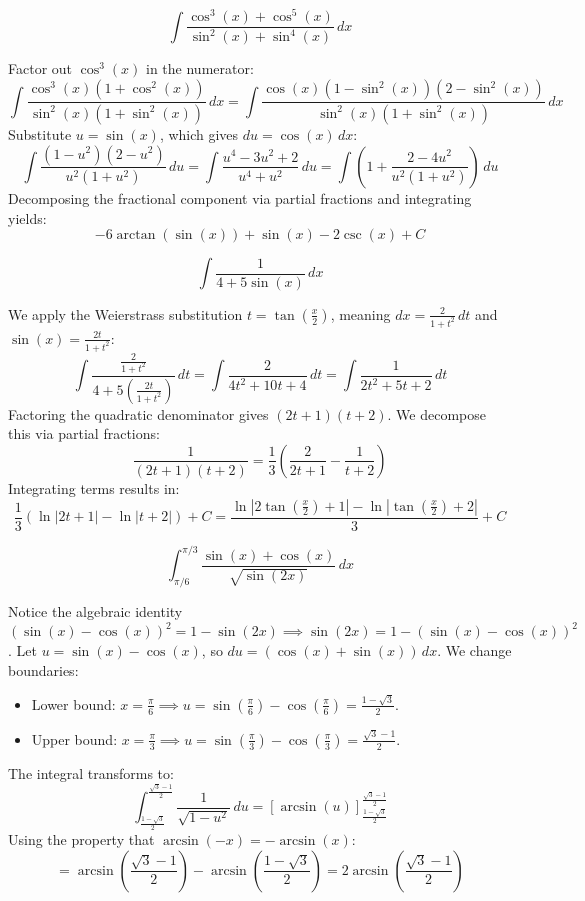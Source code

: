 \begin{questions}
    \question 
    \[ \int \frac{\cos^{3}(x)+\cos^{5}(x)}{\sin^{2}(x)+\sin^{4}(x)} \, dx \]
    \begin{solution}
        Factor out $\cos^3(x)$ in the numerator:
        \[ \int \frac{\cos^3(x)(1+\cos^2(x))}{\sin^2(x)(1+\sin^2(x))} \, dx = \int \frac{\cos(x)(1-\sin^2(x))(2-\sin^2(x))}{\sin^2(x)(1+\sin^2(x))} \, dx \]
        Substitute $u = \sin(x)$, which gives $du = \cos(x) \, dx$:
        \[ \int \frac{(1-u^2)(2-u^2)}{u^2(1+u^2)} \, du = \int \frac{u^4-3u^2+2}{u^4+u^2} \, du = \int \left( 1 + \frac{2-4u^2}{u^2(1+u^2)} \right) \, du \]
        Decomposing the fractional component via partial fractions and integrating yields:
        \[ -6\arctan(\sin(x)) + \sin(x) - 2\csc(x) + C \]
    \end{solution}

    \question 
    \[ \int \frac{1}{4+5\sin(x)} \, dx \]
    \begin{solution}
        We apply the Weierstrass substitution $t = \tan(\frac{x}{2})$, meaning $dx = \frac{2}{1+t^2} \, dt$ and $\sin(x) = \frac{2t}{1+t^2}$:
        \[ \int \frac{\frac{2}{1+t^2}}{4 + 5\left(\frac{2t}{1+t^2}\right)} \, dt = \int \frac{2}{4t^2+10t+4} \, dt = \int \frac{1}{2t^2+5t+2} \, dt \]
        Factoring the quadratic denominator gives $(2t+1)(t+2)$. We decompose this via partial fractions:
        \[ \frac{1}{(2t+1)(t+2)} = \frac{1}{3}\left(\frac{2}{2t+1} - \frac{1}{t+2}\right) \]
        Integrating terms results in:
        \[ \frac{1}{3}\left(\ln|2t+1| - \ln|t+2|\right) + C = \frac{\ln\left|2\tan\left(\frac{x}{2}\right)+1\right|-\ln\left|\tan\left(\frac{x}{2}\right)+2\right|}{3} + C \]
    \end{solution}

    \question 
    \[ \int_{\pi/6}^{\pi/3} \frac{\sin(x)+\cos(x)}{\sqrt{\sin(2x)}} \, dx \]
    \begin{solution}
        Notice the algebraic identity $(\sin(x)-\cos(x))^2 = 1 - \sin(2x) \implies \sin(2x) = 1 - (\sin(x)-\cos(x))^2$.
        Let $u = \sin(x)-\cos(x)$, so $du = (\cos(x)+\sin(x)) \, dx$.
        We change boundaries:
        \begin{itemize}
            \item Lower bound: $x = \frac{\pi}{6} \implies u = \sin(\frac{\pi}{6})-\cos(\frac{\pi}{6}) = \frac{1-\sqrt{3}}{2}$.
            \item Upper bound: $x = \frac{\pi}{3} \implies u = \sin(\frac{\pi}{3})-\cos(\frac{\pi}{3}) = \frac{\sqrt{3}-1}{2}$.
        \end{itemize}
        The integral transforms to:
        \[ \int_{\frac{1-\sqrt{3}}{2}}^{\frac{\sqrt{3}-1}{2}} \frac{1}{\sqrt{1-u^2}} \, du = \left[ \arcsin(u) \right]_{\frac{1-\sqrt{3}}{2}}^{\frac{\sqrt{3}-1}{2}} \]
        Using the property that $\arcsin(-x) = -\arcsin(x)$:
        \[ = \arcsin\left(\frac{\sqrt{3}-1}{2}\right) - \arcsin\left(\frac{1-\sqrt{3}}{2}\right) = 2\arcsin\left(\frac{\sqrt{3}-1}{2}\right) \]
    \end{solution}


\end{questions}
